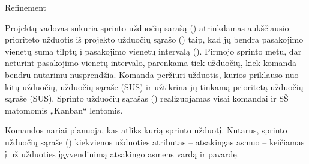 \begin{processTable}{Refinement}
{        \item Projektų vadovas sukuria sprinto užduočių sarašą () atrinkdamas aukščiausio prioriteto  užduotis iš projekto užduočių sąrašo ()  taip, kad jų bendra pasakojimo vienetų suma tilptų į pasakojimo vienetų intervalą (). Pirmojo sprinto metu, dar neturint pasakojimo vienetų intervalo, parenkama tiek užduočių, kiek komanda bendru nutarimu nusprendžia. Komanda peržiūri užduotis, kurios priklauso nuo kitų užduočių, užduočių sąraše (SUS) ir užtikrina jų tinkamą prioritetą užduočių sąraše (SUS). Sprinto užduočių sąrašas () realizuojamas visai komandai ir SŠ matomomis „Kanban“ lentomis.
        
        \item Komandos nariai planuoja, kas atliks kurią sprinto užduotį. Nutarus, sprinto užduočių sąraše () kiekvienos užduoties atributas -- atsakingas asmuo --  keičiamas į už užduoties įgyvendinimą atsakingo asmens vardą ir pavardę.
    }
\end{processTable}

\newpage
\subsubsection{}

